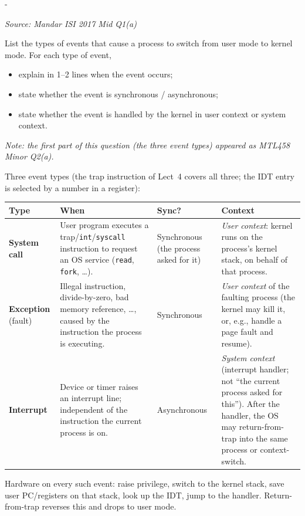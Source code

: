 \documentclass[11pt,a4paper]{article}
\makeatletter
\newcommand{\keepspace}[1]{\par\penalty-100\begingroup
  \setlength{\dimen@}{#1}\dimen@ii\pagegoal\advance\dimen@ii-\pagetotal
  \ifdim\dimen@>\dimen@ii\ifdim\dimen@ii>\z@\vfil\fi\break\fi\endgroup}
\newcounter{qn}[section]
\newenvironment{Qn}[4]{%
  \refstepcounter{qn}\keepspace{7\baselineskip}%
  \begin{tcolorbox}[qboxstyle, title={Q\thesection.\theqn\ \ [#1 \textbar\ #2]\ \ #4}]%
  {\footnotesize\color{g3}\textit{Source: #3}}\par\smallskip%
}{%
  \end{tcolorbox}%
}
\newenvironment{Sol}{%
  \begin{tcolorbox}[sboxstyle, title={Solution}]%
}{%
  \end{tcolorbox}\vspace{0.35em}%
}
\makeatother
\begin{document}
\begin{Qn}{Hard}{Lect 4}{Mandar ISI 2017 Mid Q1(a)}{User $\to$ kernel: syscall, exception, interrupt}
List the types of events that cause a process to switch from user mode to kernel mode. For each type of event,
\begin{itemize}
  \item explain in 1--2 lines when the event occurs;
  \item state whether the event is synchronous / asynchronous;
  \item state whether the event is handled by the kernel in user context or system context.
\end{itemize}
\textit{Note: the first part of this question (the three event types) appeared as MTL458 Minor Q2(a).}
\end{Qn}
\begin{Sol}
Three event types (the trap instruction of Lect~4 covers all three; the IDT entry is selected by a number in a register):
\begin{center}
\begin{tabular}{p{}p{}p{}p{}}
\hline
Type & When & Sync? & Context \\
\hline
\textbf{System call}
  & User program executes a trap/\texttt{int}/\texttt{syscall} instruction to request an OS service (\texttt{read}, \texttt{fork}, \ldots).
  & Synchronous (the process asked for it)
  & \emph{User context}: kernel runs on the process's kernel stack, on behalf of that process. \\
\textbf{Exception} (fault)
  & Illegal instruction, divide-by-zero, bad memory reference, \ldots, caused by the instruction the process is executing.
  & Synchronous
  & \emph{User context} of the faulting process (the kernel may kill it, or, e.g., handle a page fault and resume). \\
\textbf{Interrupt}
  & Device or timer raises an interrupt line; independent of the instruction the current process is on.
  & Asynchronous
  & \emph{System context} (interrupt handler; not ``the current process asked for this''). After the handler, the OS may return-from-trap into the same process or context-switch. \\
\hline
\end{tabular}
\end{center}
Hardware on every such event: raise privilege, switch to the kernel stack, save user PC/registers on that stack, look up the IDT, jump to the handler. Return-from-trap reverses this and drops to user mode.
\end{Sol}
\end{document}
